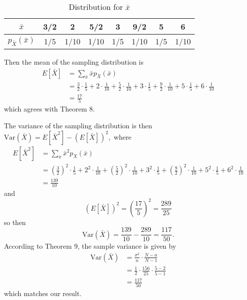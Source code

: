 \documentclass{article}
\newcommand{\var}{\mathrm{Var}}
\begin{document}
\begin{itemize}
\begin{soln}
			\begin{center}
				\begin{table}[h!]
					\centering
					\caption{Distribution for $\bar{x}$}

					\begin{tabular}{c|ccccccc}
						$\bar{x}$ & 3/2 & 2 & 5/2 & 3 & 9/2 & 5 & 6 \\ 
						\hline
						$p_{\bar{X}}(\bar{x})$ & 1/5 & 1/10 & 1/10 & 1/5 & 1/10 & 1/5 & 1/10
					\end{tabular}

				\end{table}
			\end{center}

			Then the mean of the sampling distribution is 
			\begin{align*}
				E[\bar{X}] &= \sum_{\bar{x}} \bar{x}p_{\bar{X}} (\bar{x}) \\
				&= \frac{3}{2}\cdot\frac{1}{5}+2\cdot\frac{1}{10}+\frac{5}{2}\cdot\frac{1}{10} + 3\cdot\frac{1}{5} + \frac{9}{2}\cdot\frac{1}{10} + 5\cdot\frac{1}{5}+6\cdot\frac{1}{10} \\
				&= \boxed{\frac{17}{5}}
			\end{align*} which agrees with Theorem 8.
			
			The variance of the sampling distribution is then $\var(\bar{X}) = E[\bar{X}^2]-(E[\bar{X}])^2,$ where 
			\begin{align*}
				E[\bar{X}^2] &= \sum_{\bar{x}} \bar{x}^2 p_{\bar{X}} (\bar{x}) \\
				&=  \left(\frac{3}{2}\right)^2\cdot\frac{1}{5}+2^2\cdot\frac{1}{10}+\left(\frac{5}{2}\right)^2\cdot\frac{1}{10} + 3^2\cdot\frac{1}{5} + \left(\frac{9}{2}\right)^2\cdot\frac{1}{10} + 5^2\cdot\frac{1}{5}+6^2\cdot\frac{1}{10} \\
				&= \frac{139}{10}
			\end{align*} and \[(E[\bar{X}])^2=\left( \frac{17}{5} \right)^2 = \frac{289}{25}\] so then \[\var(\bar{X})=\frac{139}{10}-\frac{289}{10} = \boxed{\frac{117}{50}.}\] According to Theorem 9, the sample variance is given by 
			\begin{align*}
				\var(\bar{X})&=\frac{\sigma^2}{n}\cdot\frac{N-n}{N-1} \\
				&= \frac{1}{2}\cdot\frac{156}{25}\cdot\frac{5-2}{5-1} \\
				&= \frac{117}{50}
			\end{align*} which matches our result.

		\end{soln}


\end{itemize}
\end{document}
